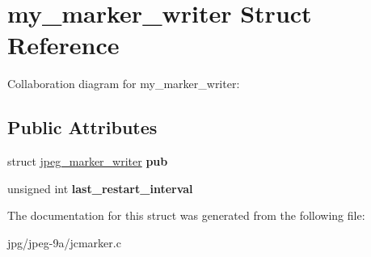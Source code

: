 \hypertarget{structmy__marker__writer}{\section{my\+\_\+marker\+\_\+writer Struct Reference}
\label{structmy__marker__writer}
}


Collaboration diagram for my\+\_\+marker\+\_\+writer\+:
\subsection*{Public Attributes}
\begin{DoxyCompactItemize}
\item 
\hypertarget{structmy__marker__writer_a4b02f71e32586520f4498e51a79b1fca}{struct \hyperlink{structjpeg__marker__writer}{jpeg\+\_\+marker\+\_\+writer} {\bfseries pub}}\label{structmy__marker__writer_a4b02f71e32586520f4498e51a79b1fca}

\item 
\hypertarget{structmy__marker__writer_a772bc536da8c387a460a529c3d8145e4}{unsigned int {\bfseries last\+\_\+restart\+\_\+interval}}\label{structmy__marker__writer_a772bc536da8c387a460a529c3d8145e4}

\end{DoxyCompactItemize}


The documentation for this struct was generated from the following file\+:\begin{DoxyCompactItemize}
\item 
jpg/jpeg-\/9a/jcmarker.\+c\end{DoxyCompactItemize}
